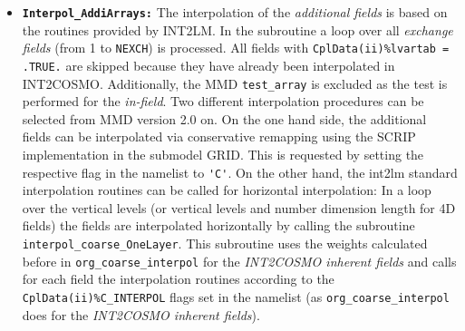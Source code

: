 \documentclass[11pt,twoside]{article}
\begin{document}
\begin{enumerate}
\begin{itemize}
\item {\tt \bf Interpol\_AddiArrays:}
The interpolation of the {\it additional fields} is based on the routines 
provided by INT2LM. In the subroutine a loop over all {\it exchange fields}
 (from 1 to \verb|NEXCH|) is processed.
All fields with \verb|CplData(ii)%lvartab = .TRUE.| are skipped 
because they have
 already been interpolated in INT2COSMO. Additionally, the MMD \verb|test_array|
 is excluded as the test is performed for the {\it in-field}.
Two different interpolation procedures can be selected from MMD
version 2.0 on. On the
one hand side, the additional fields can be interpolated via conservative
remapping using the SCRIP implementation in the submodel GRID. This is
requested by setting the respective flag in the namelist to \verb|'C'|.
On the other hand, the int2lm standard interpolation routines can be called
for horizontal interpolation: In a loop over the vertical levels (or vertical levels and number 
dimension length for 4D 
fields) the fields are interpolated horizontally by calling the subroutine
\verb|interpol_coarse_OneLayer|. This subroutine uses the weights calculated 
before in \verb|org_coarse_interpol| for the {\it INT2COSMO inherent fields} and 
calls for each field the interpolation
routines according to the \verb|CplData(ii)%C_INTERPOL| flags set in 
the namelist (as \verb|org_coarse_interpol| does for the {\it INT2COSMO 
inherent fields}).



\end{itemize}
\end{enumerate}
\end{document}

